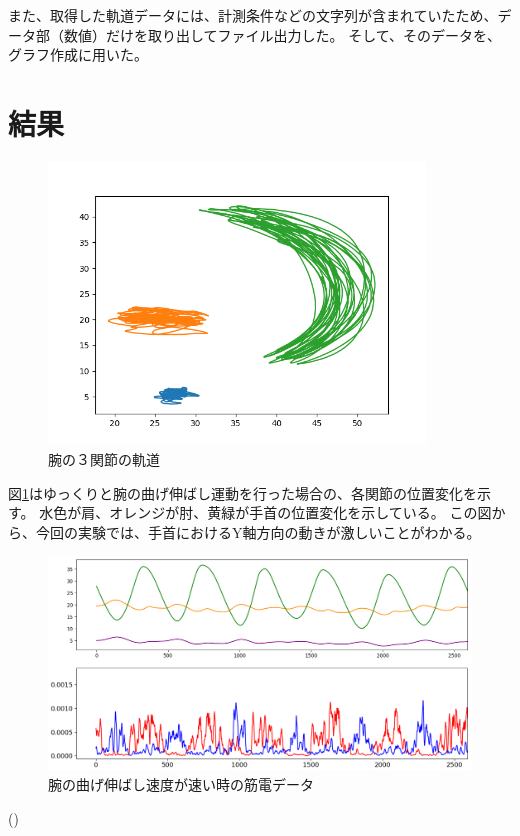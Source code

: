 \documentclass{jsarticle}
\begin{document}
また、取得した軌道データには、計測条件などの文字列が含まれていたため、データ部（数値）だけを取り出してファイル出力した。
そして、そのデータを、グラフ作成に用いた。

\clearpage
\section{結果}

\begin{figure}[h]
	\begin{center} %
		\includegraphics[width=10cm]{graph_image/slow.png}
		\caption{腕の３関節の軌道} %
		\label{kidou} %
	\end{center}
\end{figure}
図\ref{kidou}はゆっくりと腕の曲げ伸ばし運動を行った場合の、各関節の位置変化を示す。
水色が肩、オレンジが肘、黄緑が手首の位置変化を示している。
この図から、今回の実験では、手首におけるY軸方向の動きが激しいことがわかる。

\begin{figure}[!h]
	\begin{center}
		\includegraphics[width=17cm]{graph_image/fast_final.png}
		\caption{腕の曲げ伸ばし速度が速い時の筋電データ}
		\label{fast}
	\end{center}
\end{figure}
\clearpage()
\end{document}
